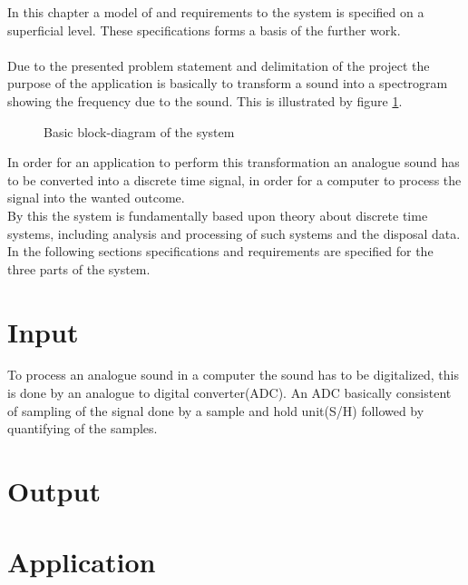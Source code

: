 In this chapter a model of and requirements to the system is specified on a superficial level. These specifications forms a basis of the further work. 
\\ \\
Due to the presented problem statement and delimitation of the project the purpose of the application is basically to transform a sound into a spectrogram showing the frequency due to the sound. This is illustrated by figure \ref{fig:model1}.    
\begin{figure}[h]
\centering
{}
\caption{Basic block-diagram of the system}
\label{fig:model1}
\end{figure}
In order for an application to perform this transformation an analogue sound has to be converted into a discrete time signal, in order for a computer to process the signal into the wanted outcome. \\
By this the system is fundamentally based upon theory about discrete time systems, including analysis and processing of such systems and the disposal data. \\
In the following sections specifications and requirements are specified for the three parts of the system.  

\section{Input}
To process an analogue sound in a computer the sound has to be digitalized, this is done by an analogue to digital converter(ADC). An ADC basically consistent of sampling of the signal done by a sample and hold unit(S/H) followed by quantifying of the samples.
        

\section{Output}

\section{Application}


